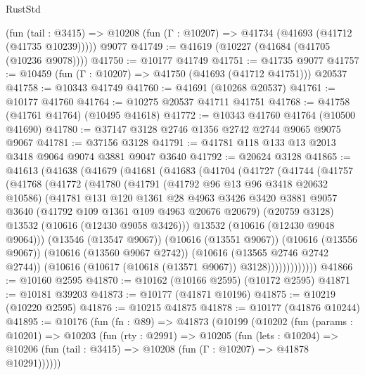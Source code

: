 \begin{lexlean}{RustStd}
\begin{coremodule}
    (fun (tail : @3415) => @10208 (fun (Γ : @10207) => @41734 (@41693 (@41712 (@41735 @10239)))))
    @9077
@41749 := @41619 (@10227 (@41684 (@41705 (@10236 @9078))))
@41750 := @10177 @41749
@41751 := @41735 @9077
@41757 := @10459 (fun (Γ : @10207) => @41750 (@41693 (@41712 @41751))) @20537
@41758 := @10343 @41749
@41760 := @41691 (@10268 @20537)
@41761 := @10177 @41760
@41764 := @10275 @20537 @41711 @41751
@41768 := @41758 (@41761 @41764) (@10495 @41618)
@41772 := @10343 @41760 @41764 (@10500 @41690)
@41780 := @37147 @3128 @2746 @1356 @2742 @2744 @9065 @9075 @9067
@41781 := @37156 @3128
@41791 := @41781 @118 @133 @13 @2013 @3418 @9064 @9074 @3881 @9047 @3640
@41792 := @20624 @3128
@41865 := @41613
    (@41638
      (@41679
        (@41681
          (@41683
            (@41704
              (@41727
                (@41744
                  (@41757
                    (@41768
                      (@41772
                        (@41780
                          (@41791
                            (@41792 @96 @13 @96 @3418 @20632 @10586)
                            (@41781
                              @131
                              @120
                              @1361
                              @28
                              @4963
                              @3426
                              @3420
                              @3881
                              @9057
                              @3640
                              (@41792 @109 @1361 @109 @4963 @20676 @20679)
                              (@20759 @3128)
                              @13532
                              (@10616 (@12430 @9058 @3426)))
                            @13532
                            (@10616 (@12430 @9048 @9064)))
                          (@13546 (@13547 @9067))
                          (@10616 (@13551 @9067))
                          (@10616 (@13556 @9067))
                          (@10616 (@13560 @9067 @2742))
                          (@10616 (@13565 @2746 @2742 @2744))
                          (@10616 (@10617 (@10618 (@13571 @9067)) @3128)))))))))))))
@41866 := @10160 @2595
@41870 := @10162 (@10166 @2595) (@10172 @2595)
@41871 := @10181 @39203
@41873 := @10177 (@41871 @10196)
@41875 := @10219 (@10220 @2595)
@41876 := @10215 @41875
@41878 := @10177 (@41876 @10244)
@41895 := @10176
    (fun (fn : @89) =>
    @41873
      (@10199
        (@10202
          (fun (params : @10201) =>
          @10203
            (fun (rty : @2991) =>
            @10205
              (fun (lets : @10204) =>
              @10206 (fun (tail : @3415) => @10208 (fun (Γ : @10207) => @41878 @10291))))))

\end{coremodule}
\end{lexlean}
